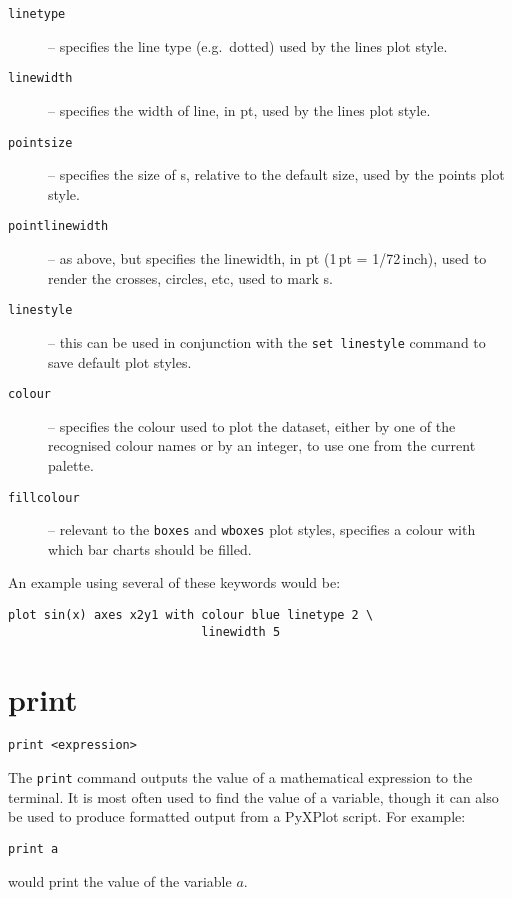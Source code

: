\begin{description}
\item[{\tt linetype}] -- specifies the line type (e.g.\ dotted) used by the lines plot style. 
\item[{\tt linewidth}] -- specifies the width of line, in pt, used by the lines plot style.
\item[{\tt pointsize}] -- specifies the size of \datapoint s, relative to the
default size, used by the points plot style. 
\item[{\tt pointlinewidth}] -- as above, but specifies the linewidth, in pt (1\,pt = 1/72\,inch),
used to render the crosses, circles, etc, used to mark \datapoint s. 
\item[{\tt linestyle}] -- this can be used in conjunction with the {\tt set linestyle} command to save default plot styles. 
\item[{\tt colour}] -- specifies the colour used to plot the dataset, either by
one of the recognised colour names or by an integer,
to use one from the current palette.  \item[{\tt fillcolour}] -- relevant to the
{\tt boxes} and {\tt wboxes} plot
styles, specifies a colour with which bar charts should be filled.
\end{description}

An example using several of these keywords would be:

\begin{verbatim}
plot sin(x) axes x2y1 with colour blue linetype 2 \
                           linewidth 5
\end{verbatim}


\section{print}

\begin{verbatim}
print <expression>
\end{verbatim}

The {\tt print} command outputs the value of a mathematical expression to the
terminal.  It is most often used to find the value of a variable, though it can
also be used to produce formatted output from a PyXPlot script. For example:

\begin{verbatim}
print a
\end{verbatim}

\noindent would print the value of the variable $a$.


